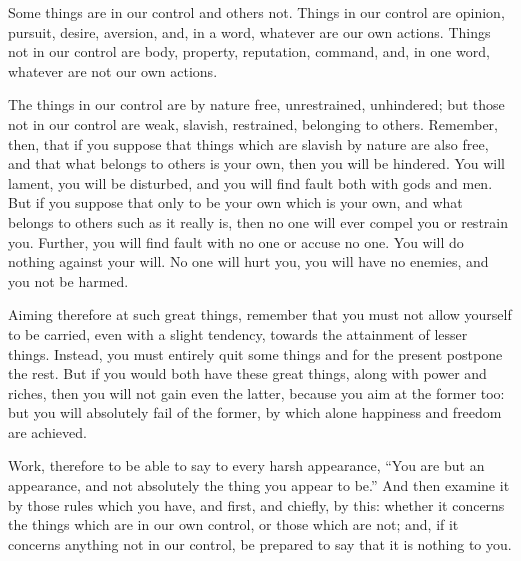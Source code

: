 Some  things are  in our  control and  others not.  Things in  our control  are
opinion,  pursuit, desire,  aversion,  and, in  a word,  whatever  are our  own
actions. Things  not in  our control are  body, property,  reputation, command,
and, in one word, whatever are not our own actions.

The things  in our control  are by  nature free, unrestrained,  unhindered; but
those not  in our control are  weak, slavish, restrained, belonging  to others.
Remember, then, that if you suppose that things which are slavish by nature are
also  free, and  that what  belongs to  others is  your own,  then you  will be
hindered. You will lament, you will be  disturbed, and you will find fault both
with gods and  men. But if you suppose  that only to be your own  which is your
own, and  what belongs to others  such as it really  is, then no one  will ever
compel you or restrain you. Further, you  will find fault with no one or accuse
no one. You will  do nothing against your will. No one will  hurt you, you will
have no enemies, and you not be harmed.

Aiming  therefore at  such  great  things, remember  that  you  must not  allow
yourself to be carried, even with  a slight tendency, towards the attainment of
lesser things. Instead, you must entirely  quit some things and for the present
postpone the rest.  But if you would  both have these great  things, along with
power and riches,  then you will not  gain even the latter, because  you aim at
the former  too: but  you will absolutely  fail of the  former, by  which alone
happiness and freedom are achieved.

Work, therefore to be  able to say to every harsh appearance,  ``You are but an
appearance, and not  absolutely the thing you appear to  be.'' And then examine
it by those rules  which you have, and first, and chiefly,  by this: whether it
concerns the things which are in our  own control, or those which are not; and,
if it  concerns anything  not in  our control, be  prepared to  say that  it is
nothing to you.

